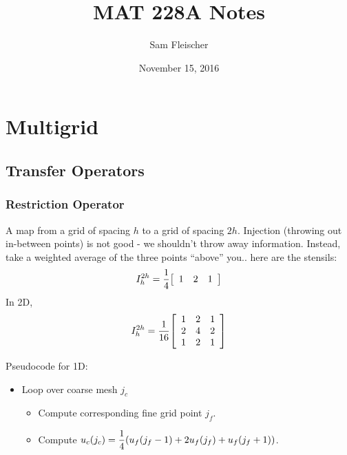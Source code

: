 \documentclass{article}
\title{MAT 228A Notes}
\author{Sam Fleischer}
\date{November 15, 2016}
\begin{document}
    \maketitle

    \section{Multigrid}

        \subsection{Transfer Operators}

            \subsubsection{Restriction Operator}

                A map from a grid of spacing $h$ to a grid of spacing $2h$.  Injection (throwing out in-between points) is not good - we shouldn't throw away information.  Instead, take a weighted average of the three points ``above'' you.. here are the stensils:
                \begin{align*}
                    I_h^{2h} = \frac{1}{4}\qty[\begin{array}{ccc}1 & 2 & 1\end{array}]
                \end{align*}
                In 2D,
                \begin{align*}
                    I_h^{2h} = \frac{1}{16}\qty[\begin{array}{ccc}1 & 2 & 1 \\ 2 & 4 & 2 \\ 1 & 2 & 1\end{array}]
                \end{align*}

                Pseudocode for 1D:
                \begin{itemize}
                    \item Loop over coarse mesh $j_c$
                    \begin{itemize}
                        \item Compute corresponding fine grid point $j_f$.
                        \item Compute $u_c(j_c) = \dfrac{1}{4}\qty(u_f(j_f-1) + 2u_f(j_f) + u_f(j_f+1))$.
                    \end{itemize}
                \end{itemize}
\end{document}
